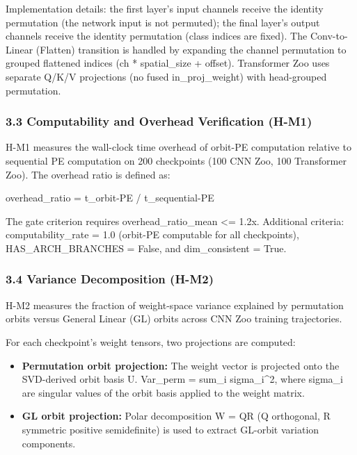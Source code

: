 Implementation details: the first layer's input channels receive the identity permutation (the network input is not permuted); the final layer's output channels receive the identity permutation (class indices are fixed). The Conv-to-Linear (Flatten) transition is handled by expanding the channel permutation to grouped flattened indices (ch * spatial_size + offset). Transformer Zoo uses separate Q/K/V projections (no fused in_proj_weight) with head-grouped permutation.

\subsubsection{3.3 Computability and Overhead Verification (H-M1)}

H-M1 measures the wall-clock time overhead of orbit-PE computation relative to sequential PE computation on 200 checkpoints (100 CNN Zoo, 100 Transformer Zoo). The overhead ratio is defined as:

    overhead_ratio = t_{orbit-PE} / t_{sequential-PE}

The gate criterion requires overhead_ratio_mean <= 1.2x. Additional criteria: computability_rate = 1.0 (orbit-PE computable for all checkpoints), HAS_ARCH_BRANCHES = False, and dim_consistent = True.

\subsubsection{3.4 Variance Decomposition (H-M2)}

H-M2 measures the fraction of weight-space variance explained by permutation orbits versus General Linear (GL) orbits across CNN Zoo training trajectories.

For each checkpoint's weight tensors, two projections are computed:

\begin{itemize}
\item \textbf{Permutation orbit projection:} The weight vector is projected onto the SVD-derived orbit basis U. Var_perm = sum_i sigma_i^2, where sigma_i are singular values of the orbit basis applied to the weight matrix.
\end{itemize}

\begin{itemize}
\item \textbf{GL orbit projection:} Polar decomposition W = QR (Q orthogonal, R symmetric positive semidefinite) is used to extract GL-orbit variation components.
\end{itemize}

